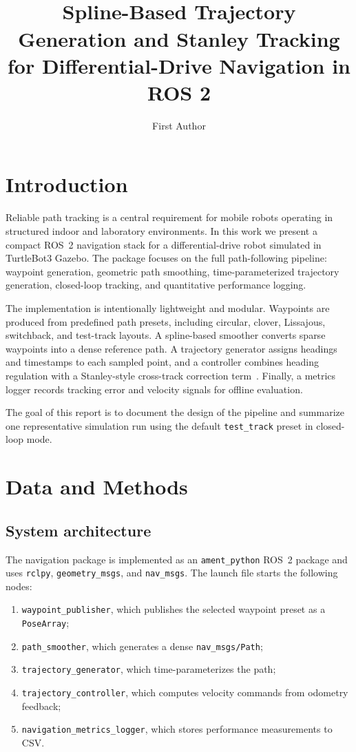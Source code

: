 \documentclass[12pt,a4paper]{cibb}
\title{\Large $\ $\\ \bf Spline-Based Trajectory Generation and Stanley Tracking for Differential-Drive Navigation in ROS 2}
\author{\large First Author}
\begin{document}
\renewcommand{\thefootnote}{}

\thispagestyle{myheadings}
\pagestyle{myheadings}

\section{Introduction}
\label{sec:SCIENTIFIC-BACKGROUND}

Reliable path tracking is a central requirement for mobile robots operating in structured indoor and laboratory environments. In this work we present a compact ROS~2 navigation stack for a differential-drive robot simulated in TurtleBot3 Gazebo. The package focuses on the full path-following pipeline: waypoint generation, geometric path smoothing, time-parameterized trajectory generation, closed-loop tracking, and quantitative performance logging.

The implementation is intentionally lightweight and modular. Waypoints are produced from predefined path presets, including circular, clover, Lissajous, switchback, and test-track layouts. A spline-based smoother converts sparse waypoints into a dense reference path. A trajectory generator assigns headings and timestamps to each sampled point, and a controller combines heading regulation with a Stanley-style cross-track correction term~\cite{thrun2006stanley}. Finally, a metrics logger records tracking error and velocity signals for offline evaluation.

The goal of this report is to document the design of the pipeline and summarize one representative simulation run using the default \texttt{test\_track} preset in closed-loop mode.

\section{Data and Methods}
\label{sec:DATA-AND-METHODS}

\subsection{System architecture}

The navigation package is implemented as an \texttt{ament\_python} ROS~2 package and uses \texttt{rclpy}, \texttt{geometry\_msgs}, and \texttt{nav\_msgs}. The launch file starts the following nodes:

\begin{enumerate}
\item \texttt{waypoint\_publisher}, which publishes the selected waypoint preset as a \texttt{PoseArray};
\item \texttt{path\_smoother}, which generates a dense \texttt{nav\_msgs/Path};
\item \texttt{trajectory\_generator}, which time-parameterizes the path;
\item \texttt{trajectory\_controller}, which computes velocity commands from odometry feedback;
\item \texttt{navigation\_metrics\_logger}, which stores performance measurements to CSV.
\end{enumerate}
\end{document}
